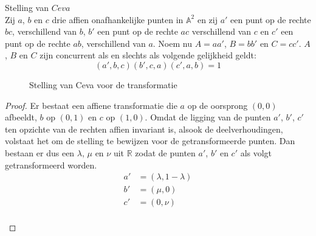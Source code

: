 \documentclass[main.tex]{subfiles}
\begin{document}
\begin{st}
  Stelling van $Ceva$\\
  Zij $a$, $b$ en $c$ drie affien onafhankelijke punten in $\mathbb{A}^{2}$ en zij $a'$ een punt op de rechte $bc$, verschillend van $b$, $b'$ een punt op de rechte $ac$ verschillend van $c$ en $c'$ een punt op de rechte $ab$, verschillend van $a$.
  Noem nu $A = aa'$, $B = bb'$ en $C=cc'$.
  $A$, $B$ en $C$ zijn concurrent als en slechts als volgende gelijkheid geldt:
  \[ (a',b,c)(b',c,a)(c',a,b) = 1\]
  \begin{figure}[H]
    \centering
    \caption{Stelling van Ceva voor de transformatie}
    \label{fig:stelling-van-ceva-voor}
  \end{figure}

  \begin{proof}
    Er bestaat een affiene transformatie die $a$ op de oorsprong $(0,0)$ afbeeldt, $b$ op $(0,1)$ en $c$ op $(1,0)$.
    Omdat de ligging van de punten $a'$, $b'$, $c'$ ten opzichte van de rechten affien invariant is, alsook de deelverhoudingen, volstaat het om de stelling te bewijzen voor de getransformeerde punten.
    Dan bestaan er dus een $\lambda$, $\mu$ en $\nu$ uit $\mathbb{R}$ zodat de punten $a'$, $b'$ en $c'$ als volgt getransformeerd worden.
    \[
    \begin{array}{cl}
      a' &= (\lambda,1-\lambda)\\
      b' &= (\mu, 0)\\
      c' &= (0,\nu)\\
    \end{array}
    \]
    \begin{figure}[H]
    \centering
\end{figure}
\end{proof}
\end{st}
\end{document}
